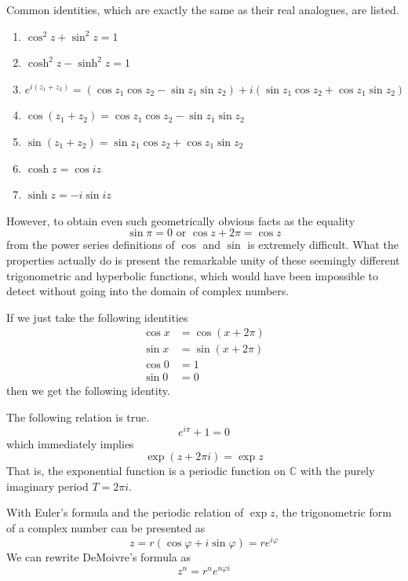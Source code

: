     \begin{lemma}
      Common identities, which are exactly the same as their real analogues, are listed. 
      \begin{enumerate}
        \item $\cos^2{z} + \sin^2 {z} = 1$
        \item $\cosh^2{z} - \sinh^2{z} = 1$ 
        \item $e^{i(z_1 + z_2)} = (\cos{z_1} \cos{z_2} - \sin{z_1} \sin{z_2}) + i (\sin{z_1} \cos{z_2} + \cos{z_1} \sin{z_2})$
        \item $\cos{(z_1 + z_2)} = \cos{z_1} \cos{z_2} - \sin{z_1} \sin{z_2}$
        \item $\sin{(z_1 + z_2)} = \sin{z_1} \cos{z_2} + \cos{z_1} \sin{z_2}$
        \item $\cosh{z} = \cos{iz}$ 
        \item $\sinh{z} = -i \sin{iz}$
      \end{enumerate}
    \end{lemma}

    However, to obtain even such geometrically obvious facts as the equality
    \[\sin{\pi} = 0 \text{ or } \cos{z + 2\pi} = \cos{z}\]
    from the power series definitions of $\cos$ and $\sin$ is extremely difficult. What the properties actually do is present the remarkable unity of these seemingly different trigonometric and hyperbolic functions, which would have been impossible to detect without going into the domain of complex numbers. 

    If we just take the following identities
    \begin{align*}
        \cos{x} & = \cos{(x + 2 \pi)} \\
        \sin{x} & = \sin{(x + 2\pi)} \\
        \cos{0} & = 1 \\
        \sin{0} & = 0
    \end{align*}
    then we get the following identity. 

    \begin{theorem}
    The following relation is true. 
    \[e^{i\pi} + 1 = 0\]
    which immediately implies 
    \[\exp(z + 2\pi i) = \exp{z}\]
    That is, the exponential function is a periodic function on $\mathbb{C}$ with the purely imaginary period $T = 2 \pi i$. 
    \end{theorem}

    \begin{corollary}
    With Euler's formula and the periodic relation of $\exp{z}$, the trigonometric form of a complex number can be presented as
    \[z = r(\cos{\varphi} + i \sin{\varphi}) = r e^{i \varphi}\]
    We can rewrite DeMoivre's formula as
    \[z^n = r^n e^{n \varphi i}\]
    \end{corollary}

